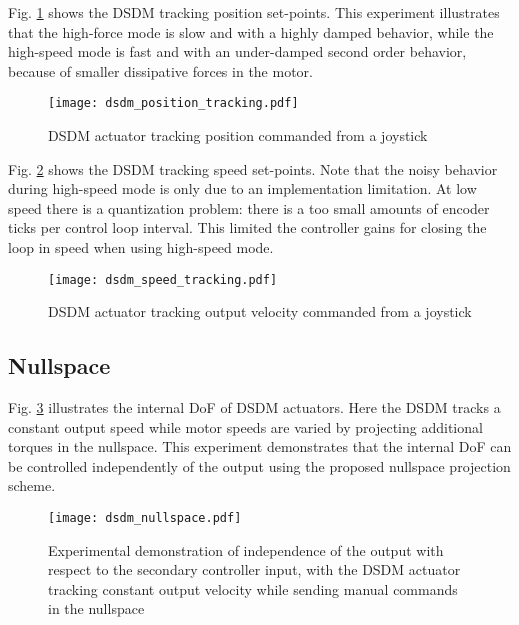 Fig. \ref{fig:dsdm_position_tracking} shows the DSDM tracking position set-points. This experiment illustrates that the high-force mode is slow and with a highly damped behavior, while the high-speed mode is fast and with an under-damped second order behavior, because of smaller dissipative forces in the motor. 
%
\begin{figure}[H]
	\centering
		\texttt{[image: dsdm\_position\_tracking.pdf]}
		\vspace{-10pt}
	\caption[DSDM actuator position control]{DSDM actuator tracking position commanded from a joystick }
	\label{fig:dsdm_position_tracking}
\end{figure}
%
Fig. \ref{fig:dsdm_speed_tracking} shows the DSDM tracking speed set-points. Note that the noisy behavior during high-speed mode is only due to an implementation limitation. At low speed there is a quantization problem: there is a too small amounts of encoder ticks per control loop interval. This limited the controller gains for closing the loop in speed when using high-speed mode.
%
\begin{figure}[htb]
	\centering
		\texttt{[image: dsdm\_speed\_tracking.pdf]}
		\vspace{-10pt}
	\caption[DSDM actuator velocity control]{DSDM actuator tracking output velocity commanded from a joystick }
	\label{fig:dsdm_speed_tracking}
	\vspace{-10pt}
\end{figure}


\subsection{Nullspace}

Fig. \ref{fig:dsdm_nullspace} illustrates the internal DoF of DSDM actuators. Here the DSDM tracks a constant output speed while motor speeds are varied by projecting additional torques in the nullspace. This experiment demonstrates that the internal DoF can be controlled independently of the output using the proposed nullspace projection scheme. 
%
\begin{figure}[htb]
	\centering
		\texttt{[image: dsdm\_nullspace.pdf]}
		\vspace{-10pt}
	\caption[DSDM actuator tracking constant output velocity: nullspace]{Experimental demonstration of independence of the output with respect to the secondary controller input, with the DSDM actuator tracking constant output velocity while sending manual commands in the nullspace }
	\label{fig:dsdm_nullspace}
	\vspace{-10pt}
\end{figure}


